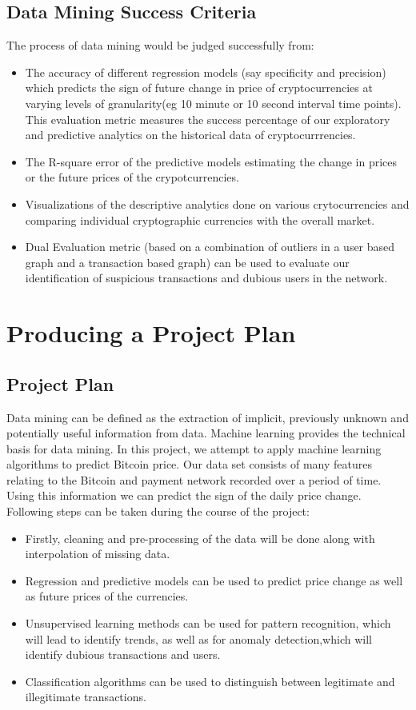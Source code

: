 \documentclass{article}
\begin{document}
\subsection{Data Mining Success Criteria}
The process of data mining would be judged successfully from:
\begin{itemize}
    \item The accuracy of different regression models (say specificity and precision) which predicts the sign of future change in price of cryptocurrencies at varying levels of granularity(eg 10 minute or 10 second interval time points). This evaluation metric measures the success percentage of our exploratory and predictive analytics on the historical data of cryptocurrrencies.
    \item The R-square error of the predictive models estimating the change in prices or the future prices of the crypotcurrencies.
    \item Visualizations of the descriptive analytics done on various crytocurrencies and comparing individual cryptographic currencies with the overall market.
    \item Dual Evaluation metric (based on a combination of outliers in a user based graph and a transaction based graph) can be used to evaluate our identification of suspicious transactions and dubious users in the network.
\end{itemize}

\section{Producing a Project Plan}
\subsection{Project Plan}
Data mining can be defined as the extraction of implicit, previously unknown and potentially useful information from data. Machine learning provides the technical basis for data mining. In this project, we attempt to apply machine learning algorithms to predict Bitcoin price. Our data set consists of many features relating to the Bitcoin and payment network recorded over a period of time. Using this information we can predict the sign of the daily price change. Following steps can be taken during the course of the project:
\begin{itemize}
    \item Firstly, cleaning and pre-processing of the data will be done along with interpolation of missing data.
    \item Regression and predictive models can be used to predict price change as well as future prices of the currencies.
    \item Unsupervised learning methods can be used for pattern recognition, which will lead to identify trends, as well as for anomaly detection,which will identify dubious transactions and users.
    \item Classification algorithms can be used to distinguish between legitimate and illegitimate transactions.
\end{itemize}
\end{document}
